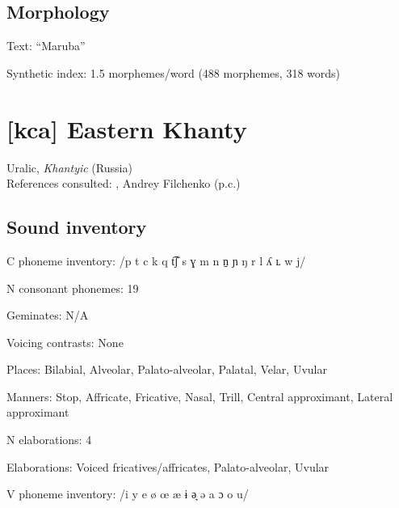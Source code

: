 {\subsection*{Morphology}

\begin{appendixdesc}

\item[Text:] “Maruba” \citep[72--76]{Dutton1996}

\item[Synthetic index:] 1.5 morphemes/word (488 morphemes, 318 words)
\end{appendixdesc}
\section*{[kca] Eastern Khanty}  %
Uralic, \textit{Khantyic} (Russia)\medskip\\
References consulted: \citet{Filchenko2007}, Andrey Filchenko (p.c.)

\subsection*{Sound inventory}
\begin{appendixdesc}

\item[C phoneme inventory:] /p t c k q t͡ʃ s ɣ m n n̠ ɲ ŋ r l ʎ ʟ w j/

\item[N consonant phonemes:] 19

\item[Geminates:] N/A

\item[Voicing contrasts:] None

\item[Places:] Bilabial, Alveolar, Palato-alveolar, Palatal, Velar, Uvular

\item[Manners:] Stop, Affricate, Fricative, Nasal, Trill, Central approximant, Lateral approximant

\item[N elaborations:] 4

\item[Elaborations:] Voiced fricatives/affricates, Palato-alveolar, Uvular

\item[V phoneme inventory:] /i y e ø œ æ ɨ ə̘ ə a ɔ o u/


\end{appendixdesc}}

